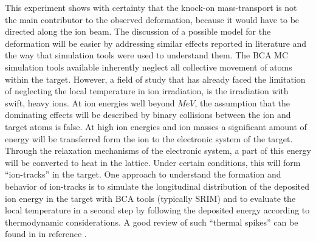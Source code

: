 This experiment shows with certainty that the knock-on mass-transport is not the main contributor to the observed deformation, because it would have to be directed along the ion beam. The discussion of a possible model for the deformation will be easier by addressing similar effects reported in literature and the way that simulation tools were used to understand them. The BCA MC simulation tools available inherently neglect all collective movement of atoms within the target. However, a field of study that has already faced the limitation of neglecting the local temperature in ion irradiation, is the irradiation with swift, heavy ions. At ion energies well beyond $MeV$, the assumption that the dominating effects will be described by binary collisions between the ion and target atoms is false. At high ion energies and ion masses a significant amount of energy will be transferred form the ion to the electronic system of the target. Through the relaxation mechanisms of the electronic system, a part of this energy will be converted to heat in the lattice. Under certain conditions, this will form ``ion-tracks'' in the target. One approach to understand the formation and behavior of ion-tracks is to simulate the longitudinal distribution of the deposited ion energy in the target with BCA tools (typically SRIM) and to evaluate the local temperature in a second step by following the deposited energy according to thermodynamic considerations. A good review of such ``thermal spikes'' can be found in in reference \cite{wesch_effect_2004}. 

